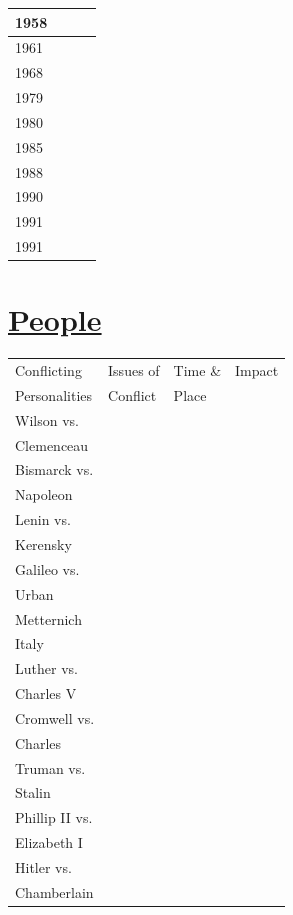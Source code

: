 \documentclass[12pt]{article}
\begin{document}
\begin{enumerate}
\begin{tabular}{|l|l|l|l|}
\hline
1958 & & & \\
\hline
1961 & & & \\
\hline
1968 & & & \\
\hline
1979 & & & \\
\hline
1980 & & & \\
\hline
1985 & & & \\
\hline
1988 & & & \\
\hline
1990 & & & \\
\hline
1991 & & & \\
\hline
1991 & & & \\
\hline
\end{tabular}

\section{\underline{People}}

\begin{tabular}{|l|l|l|l|}
\hline
Conflicting & Issues of & Time \& & Impact \\
Personalities & Conflict & Place & \\
\hline
Wilson vs. & & & \\
Clemenceau & & & \\
\hline
Bismarck vs. & & & \\
Napoleon & & & \\
\hline
Lenin vs. & & & \\
Kerensky  & & & \\
\hline
Galileo vs. & & & \\
Urban & & & \\
\hline
Metternich & & & \\
Italy & & & \\
\hline
Luther vs. & & & \\
Charles V & & & \\
\hline
Cromwell vs. & & & \\
Charles & & & \\
\hline
Truman vs. & & & \\
Stalin & & & \\
\hline
Phillip II vs. & & & \\
Elizabeth I & & & \\
\hline
Hitler vs. & & & \\
Chamberlain & & & \\
\hline


\end{tabular}

\begin{tabular}{|l|l|l|l|l|l|}


\end{tabular}
\end{enumerate}
\end{document}
